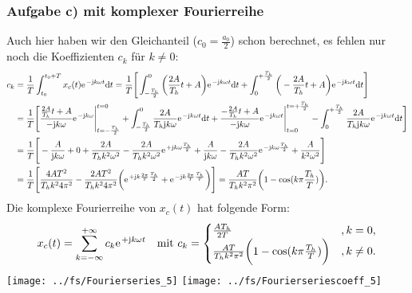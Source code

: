 \documentclass[11pt,a4paper,DIV=12]{scrartcl}
\newcommand{\diff}{\mathrm{d}}
\begin{document}
\subsubsection*{Aufgabe c) mit komplexer Fourierreihe}
Auch hier haben wir den Gleichanteil ($c_0=\frac{a_0}{2}$) schon berechnet, es fehlen nur noch die Koeffizienten $c_k$ für $k\neq 0$:
\begin{align}
	c_k&=\frac{1}{T}\int_{t_0}^{t_0+T}x_{c}(t)\e^{-\im k \omega t}\diff t=\frac{1}{T}\Bigg [\int_{-\frac{T_h}{2}}^0\bigg (\frac{2A}{T_h}t+A\bigg )\e^{-\im k \omega t}\diff t+\int_0^{+\frac{T_h}{2}}\bigg (-\frac{2A}{T_h}t+A\bigg )\e^{-\im k \omega t}\diff t\Bigg ]\nonumber \\
	&=\frac{1}{T}\Bigg [ \frac{\frac{2A}{T_h}t+A}{-\im k \omega}\e^{-\im k \omega}\Bigg|_{t=-\frac{T_h}{2}}^{t=0}+\int_{-\frac{T_h}{2}}^0\frac{2A}{T_h\im k\omega}\e^{-\im k \omega t}\diff t+\frac{-\frac{2A}{T_h}t+A}{-\im k \omega}\e^{-\im k \omega t}\Bigg |_{t=0}^{t=+\frac{T_h}{2}}-\int_0^{+\frac{T_h}{2}}\frac{2A}{T_h\im k\omega}\e^{-\im k \omega t}\diff t\Bigg ]\nonumber \\
	&=\frac{1}{T}\Bigg [-\frac{A}{\im k \omega}+0+\frac{2A}{T_h k^2\omega^2}-\frac{2A}{T_hk^2\omega^2}\e^{+\im k \omega \frac{T_h}{2}}+\frac{A}{\im k \omega}-\frac{2A}{T_hk^2\omega^2}\e^{-\im k \omega \frac{T_h}{2}}+\frac{A}{k^2\omega^2}\Bigg ]\nonumber \\
	&=\frac{1}{T}\Bigg [\frac{4AT^2}{T_hk^24\pi^2}-\frac{2AT^2}{T_hk^24\pi^2}\bigg (\e^{+\im k \frac{2\pi}{T}\frac{T_h}{2}}+\e^{-\im k\frac{2\pi}{T}\frac{T_h}{T}}\bigg ) \Bigg ]=\frac{AT}{T_hk^2\pi^2}\bigg (1-\cos(k\pi\frac{T_h}{T})\bigg ).
\end{align}
Die komplexe Fourierreihe von $x_{c}(t)$ hat folgende Form:
\begin{align}
	x_{c}(t)=\sum_{k=-\infty}^{+\infty}c_k\e^{+\im k \omega t}\quad\text{mit }c_k=\begin{cases}
		\frac{AT_h}{2T}&,k=0,\\
		\frac{AT}{T_hk^2\pi^2}\bigg (1-\cos(k\pi\frac{T_h}{T})\bigg )&,k\neq 0.
	\end{cases}
\end{align}
\newpage
\texttt{[image: ../fs/Fourierseries\_5]}
\texttt{[image: ../fs/Fourierseriescoeff\_5]}
\newpage
\end{document}
